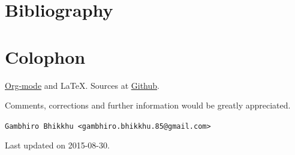 \documentclass[11pt,oneside]{memoir-article}
\begin{document}
\backmatter

\chapter{Bibliography}
\label{sec-6}
\label{bibliography}



\chapter{Colophon}
\label{sec-7}

\href{http://orgmode.org/}{Org-mode} and \LaTeX. Sources at \href{https://github.com/profound-labs/calculating-the-uposatha-moondays/}{Github}.

Comments, corrections and further information would be greatly
appreciated.

\texttt{Gambhiro Bhikkhu <gambhiro.bhikkhu.85@gmail.com>}

Last updated on 2015-08-30.
\end{document}
